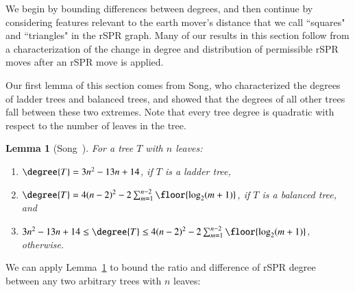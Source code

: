 \documentclass[]{elsarticle}
\newtheorem{lem}[thm]{Lemma}
\begin{document}
We begin by bounding differences between degrees, and then continue by considering features relevant to the earth mover's distance that we call ``squares" and ``triangles" in the rSPR graph.
Many of our results in this section follow from a characterization of the change in degree and distribution of permissible rSPR moves after an rSPR move is applied.

Our first lemma of this section comes from Song, who characterized the degrees of ladder trees and balanced trees, and showed that the degrees of all other trees fall between these two extremes.
Note that every tree degree is quadratic with respect to the number of leaves in the tree.

\begin{lem}[{Song~\citep{Song2003-gf}}]
	\label{lem:degree_extremes}
	For a tree $T$ with $n$ leaves:
	\begin{enumerate}
		\item $\degree{T} = 3n^2 - 13n + 14$, if $T$ is a ladder tree,
		\item $\degree{T} = 4(n-2)^2 - 2 \sum_{m=1}^{n-2} \floor{\log_2(m+1)}$, if $T$ is a balanced tree, and
		\item  $3n^2 - 13n + 14 \le \degree{T} \le 4(n-2)^2 - 2 \sum_{m=1}^{n-2} \floor{\log_2(m+1)}$, otherwise.
	\end{enumerate}
\end{lem}

We can apply Lemma~\ref{lem:degree_extremes} to bound the ratio and difference of rSPR degree between any two arbitrary trees with $n$ leaves:
\end{document}
